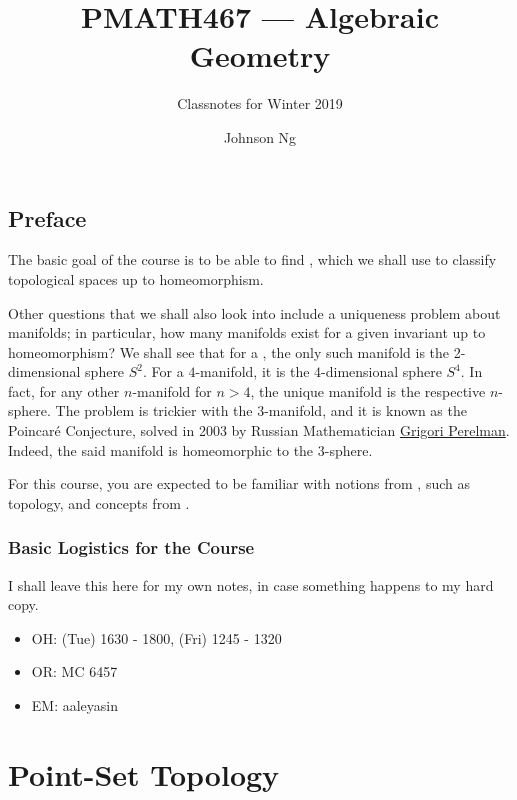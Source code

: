 \documentclass[notoc,notitlepage]{tufte-book}
\title{PMATH467 --- Algebraic Geometry}
\author{Johnson Ng}
\subtitle{Classnotes for Winter 2019}
\begin{document}


\chapter*{Preface}%
\label{chp:preface}

The basic goal of the course is to be able to find , which we shall use to classify topological spaces up to homeomorphism.

Other questions that we shall also look into include a uniqueness problem about manifolds; in particular, how many manifolds exist for a given invariant up to homeomorphism? We shall see that for a , the only such manifold is the 2-dimensional sphere $S^2$. For a $4$-manifold, it is the $4$-dimensional sphere $S^4$. In fact, for any other $n$-manifold for $n > 4$, the unique manifold is the respective $n$-sphere. The problem is trickier with the $3$-manifold, and it is known as the Poincar\'{e} Conjecture, solved in 2003 by Russian Mathematician \href{https://en.wikipedia.org/wiki/Grigori_Perelman}{Grigori Perelman}. Indeed, the said manifold is homeomorphic to the $3$-sphere.

For this course, you are expected to be familiar with notions from , such as topology, and concepts from .

\section*{Basic Logistics for the Course}%

I shall leave this here for my own notes, in case something happens to my hard copy.

\begin{itemize}
  \item OH: (Tue) 1630 - 1800, (Fri) 1245 - 1320
  \item OR: MC 6457
  \item EM: aaleyasin
\end{itemize}



\part{Point-Set Topology}
\restoregeometry
\end{document}
